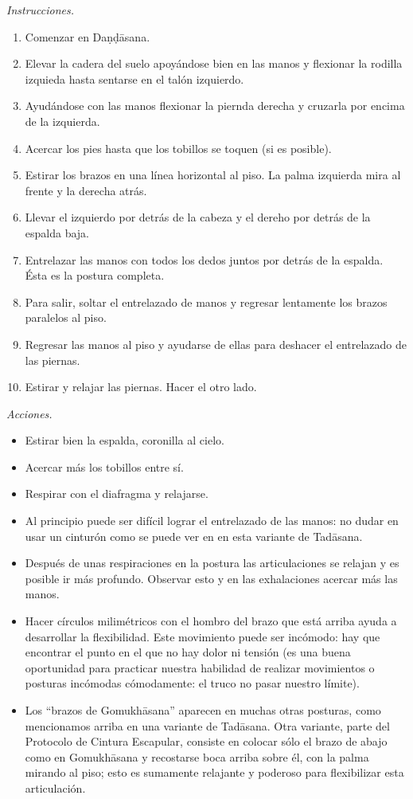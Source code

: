 \emph{Instrucciones.}
\begin{enumerate}
\item Comenzar en Daṇḍāsana.
\item Elevar la cadera del suelo apoyándose
bien en las manos y flexionar la rodilla
izquieda hasta sentarse en el talón
izquierdo.
\item Ayudándose con las manos flexionar la
piernda derecha y cruzarla por encima de la
izquierda.
\item Acercar los pies hasta que los tobillos
se toquen (si es posible).
\item Estirar los brazos en una línea
horizontal al piso. La palma izquierda mira
al frente y la derecha atrás.
\item Llevar el izquierdo por detrás de la
cabeza y el dereho por detrás de la espalda
baja.
\item Entrelazar las manos con todos los
dedos juntos por detrás de la espalda. Ésta
es la postura completa.
\item Para salir, soltar el entrelazado de
manos y regresar lentamente los brazos
paralelos al piso.
\item Regresar las manos al piso y ayudarse
de ellas para deshacer el entrelazado de las
piernas.
\item Estirar y relajar las piernas. Hacer el
otro lado.
\end{enumerate}

\emph{Acciones.}
\begin{itemize}
\item Estirar bien la espalda, coronilla al
cielo.
\item Acercar más los tobillos entre sí.
\item Respirar con el diafragma y relajarse.
\item Al principio puede ser difícil lograr
el entrelazado de las manos: no dudar en usar
un cinturón como se puede ver en en esta
variante de Tadāsana.
\item Después de unas respiraciones en la
postura las articulaciones se relajan y es
posible ir más profundo. Observar esto y en
las exhalaciones acercar más las manos.
\item Hacer círculos milimétricos con el
hombro del brazo que está arriba ayuda a
desarrollar la flexibilidad. Este movimiento
puede ser incómodo: hay que encontrar el
punto en el que no hay dolor ni tensión (es
una buena oportunidad para practicar nuestra
habilidad de realizar movimientos o posturas
incómodas cómodamente: el truco no pasar
nuestro límite).
\item Los ``brazos de Gomukhāsana'' aparecen
en muchas otras posturas, como mencionamos
arriba en una variante de Tadāsana. Otra
variante, parte del Protocolo de Cintura
Escapular, consiste en colocar sólo el brazo
de abajo como en Gomukhāsana y recostarse
boca arriba sobre él, con la palma mirando al
piso; esto es sumamente relajante y poderoso
para flexibilizar esta articulación.
\end{itemize}

